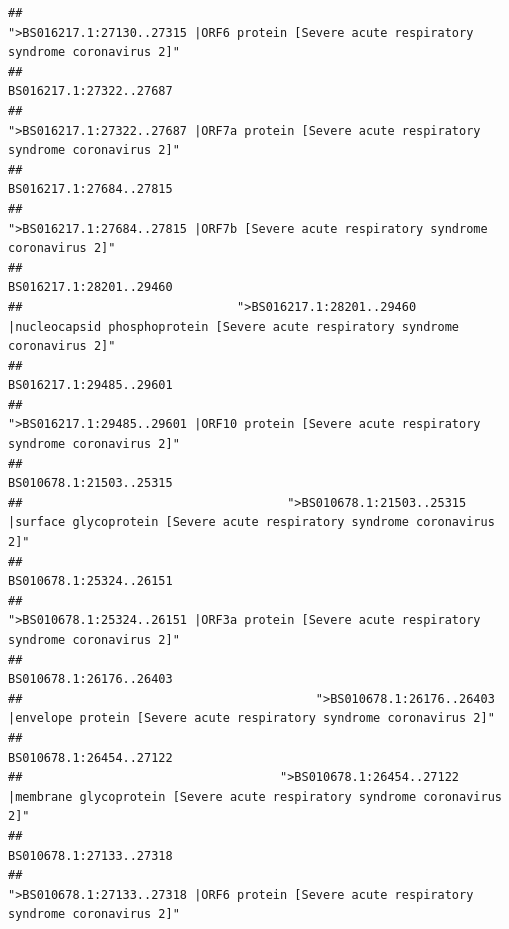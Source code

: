 \documentclass[
]{article}
\begin{document}
\begin{verbatim}
##                                             ">BS016217.1:27130..27315 |ORF6 protein [Severe acute respiratory syndrome coronavirus 2]" 
##                                                                                                                BS016217.1:27322..27687 
##                                            ">BS016217.1:27322..27687 |ORF7a protein [Severe acute respiratory syndrome coronavirus 2]" 
##                                                                                                                BS016217.1:27684..27815 
##                                                    ">BS016217.1:27684..27815 |ORF7b [Severe acute respiratory syndrome coronavirus 2]" 
##                                                                                                                BS016217.1:28201..29460 
##                              ">BS016217.1:28201..29460 |nucleocapsid phosphoprotein [Severe acute respiratory syndrome coronavirus 2]" 
##                                                                                                                BS016217.1:29485..29601 
##                                            ">BS016217.1:29485..29601 |ORF10 protein [Severe acute respiratory syndrome coronavirus 2]" 
##                                                                                                                BS010678.1:21503..25315 
##                                     ">BS010678.1:21503..25315 |surface glycoprotein [Severe acute respiratory syndrome coronavirus 2]" 
##                                                                                                                BS010678.1:25324..26151 
##                                            ">BS010678.1:25324..26151 |ORF3a protein [Severe acute respiratory syndrome coronavirus 2]" 
##                                                                                                                BS010678.1:26176..26403 
##                                         ">BS010678.1:26176..26403 |envelope protein [Severe acute respiratory syndrome coronavirus 2]" 
##                                                                                                                BS010678.1:26454..27122 
##                                    ">BS010678.1:26454..27122 |membrane glycoprotein [Severe acute respiratory syndrome coronavirus 2]" 
##                                                                                                                BS010678.1:27133..27318 
##                                             ">BS010678.1:27133..27318 |ORF6 protein [Severe acute respiratory syndrome coronavirus 2]" 

\end{verbatim}
\end{document}
